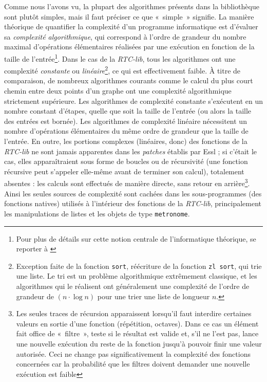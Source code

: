 \documentclass[a4paper,12pt]{article}
\newcommand{\guill}[1]{«~#1~»}
\begin{document}
Comme nous l'avons vu, la plupart des algorithmes présents dans la bibliothèque sont plutôt simples, mais il faut préciser ce que \guill{simple} signifie. La manière théorique de quantifier la complexité d'un programme informatique est d'évaluer sa \emph{complexité algorithmique}, qui correspond à l'ordre de grandeur du nombre maximal d'opérations élémentaires réalisées par une exécution en fonction de la taille de l'entrée\footnote{Pour plus de détails sur cette notion centrale de l'informatique théorique, se reporter à \cite{knuth1998art}}. Dans le cas de la \emph{RTC-lib}, tous les algorithmes ont une complexité \emph{constante} ou \emph{linéaire}\footnote{Exception faite de la fonction \texttt{sort}, réécriture de la fonction \texttt{zl sort}, qui trie une liste. Le tri est un problème algorithmique extrêmement classique, et les algorithmes qui le réalisent ont généralement une complexité de l'ordre de grandeur de $(n\cdot\log n)$ pour une trier une liste de longueur $n$.}, ce qui est effectivement faible. À titre de comparaison, de nombreux algorithmes courants comme le calcul du plus court chemin entre deux points d'un graphe ont une complexité algorithmique strictement supérieure. Les algorithmes de complexité constante s'exécutent en un nombre constant d'étapes, quelle que soit la taille de l'entrée (ou alors la taille des entrées est bornée). Les algorithmes de complexité linéaire nécessitent un nombre d'opérations élémentaires du même ordre de grandeur que la taille de l'entrée. En outre, les portions complexes (linéaires, donc) des fonctions de la \emph{RTC-lib} ne sont jamais apparentes dans les \emph{patches} établis par Essl ; si c'était le cas, elles apparaîtraient sous forme de boucles ou de récursivité (une fonction récursive peut s'appeler elle-même avant de terminer son calcul), totalement absentes : les calculs sont effectués de manière directe, sans retour en arrière\footnote{Les seules traces de récursion apparaissent lorsqu'il faut interdire certaines valeurs en sortie d'une fonction (répétition, octaves). Dans ce cas un élément fait office de \guill{filtre}, teste si le résultat est valide et, s'il ne l'est pas, lance une nouvelle exécution du reste de la fonction jusqu'à pouvoir finir une valeur autorisée. Ceci ne change pas significativement la complexité des fonctions concernées car la probabilité que les filtres doivent demander une nouvelle exécution est faible}. Ainsi les seules sources de complexité sont cachées dans les sous-programmes (des fonctions natives) utilisés à l'intérieur des fonctions de la \emph{RTC-lib}, principalement les manipulations de listes et les objets de type \texttt{metronome}.
\end{document}

